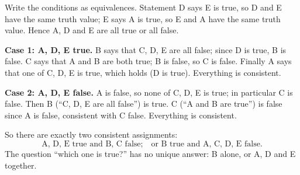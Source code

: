 Write the conditions as equivalences. Statement D says E is true, so D and E have the same truth value; E says A is true, so E and A have the same truth value. Hence A, D and E are all true or all false.

\textbf{Case 1: A, D, E true.} B says that C, D, E are all false; since D is true, B is false. C says that A and B are both true; B is false, so C is false. Finally A says that one of C, D, E is true, which holds (D is true). Everything is consistent.

\textbf{Case 2: A, D, E false.} A is false, so none of C, D, E is true; in particular C is false. Then B (``C, D, E are all false'') is true. C (``A and B are true'') is false since A is false, consistent with C false. Everything is consistent.

So there are exactly two consistent assignments:
\[\boxed{\text{A, D, E true and B, C false;}\quad\text{or B true and A, C, D, E false.}}\]
The question ``which one is true?'' has no unique answer: B alone, or A, D and E together.
